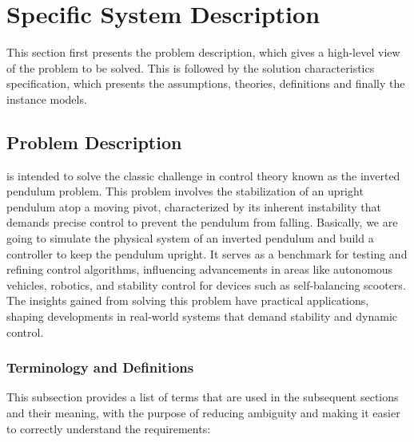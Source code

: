 \documentclass[12pt]{article}
\begin{document}
\section{Specific System Description} \label{sec:specific_user_desc}

This section first presents the problem description, which gives a high-level
view of the problem to be solved.  This is followed by the solution characteristics
specification, which presents the assumptions, theories, definitions and finally
the instance models.  

\subsection{Problem Description} \label{Sec_pd}

\progname{} is intended to solve 
the classic challenge in control theory known as
the inverted pendulum problem. This problem involves
the stabilization of an upright pendulum atop a moving pivot,
characterized by its inherent instability that demands
precise control to prevent the pendulum from falling. 
Basically, we are going to simulate the physical system of 
an inverted pendulum and build a controller to keep the pendulum upright. 
It serves as a benchmark for testing and refining control algorithms,
influencing advancements in areas like autonomous vehicles, robotics,
and stability control for devices such as self-balancing scooters.
The insights gained from solving this problem have practical applications,
shaping developments in real-world systems that
demand stability and dynamic control.

\subsubsection{Terminology and  Definitions}


This subsection provides a list of terms that are used in the subsequent
sections and their meaning, with the purpose of reducing ambiguity and making it
easier to correctly understand the requirements:
\end{document}
